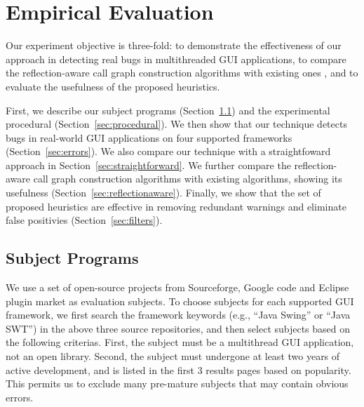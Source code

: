 \section{Empirical Evaluation}
\label{sec:evaluation}





Our experiment objective is three-fold: to demonstrate the effectiveness
of our approach in detecting real bugs in multithreaded GUI applications, to 
compare the reflection-aware call graph construction algorithms
with existing ones , and to evaluate the usefulness of the proposed 
 heuristics.  

First, we describe our subject programs (Section~\ref{sec:subjects}) and the experimental procedural (Section~\ref{sec:procedural}).
We then show that our technique detects bugs in real-world GUI applications on
four supported frameworks (Section~\ref{sec:errors}). We also compare our technique with
a straightfoward approach in Section~\ref{sec:straightforward}. We further compare the reflection-aware call graph
construction algorithms with existing algorithms, showing its usefulness (Section~\ref{sec:reflectionaware}).
 Finally, we show that the set of proposed heuristics are effective
in removing redundant warnings and eliminate false positivies (Section~\ref{sec:filters}). 



\subsection{Subject Programs}
\label{sec:subjects}

We use a set of open-source projects from Sourceforge, Google code and Eclipse plugin
market as evaluation subjects. To choose subjects for each supported GUI framework,
we first search the framework keywords (e.g., ``Java Swing'' or ``Java SWT'')
in the above three source repositories, and then select subjects based on the following
criterias. First, the subject must be a multithread GUI application, not
an open library. Second, the subject must undergone at least two years of active development,
and is listed in the first 3 results pages based on popularity. This permits us
to exclude many pre-mature subjects that may contain obvious errors.

